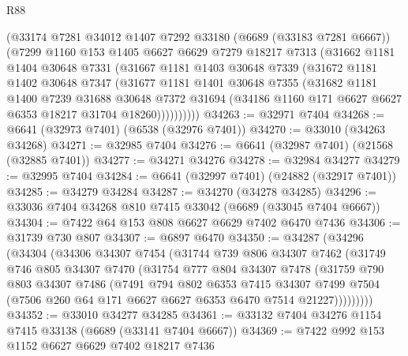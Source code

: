 \begin{lexlean}{R88}
\begin{coremodule}
        (@33174
          @7281
          @34012
          @1407
          @7292
          @33180
          (@6689 (@33183 @7281 @6667))
          (@7299
            @1160
            @153
            @1405
            @6627
            @6629
            @7279
            @18217
            @7313
            (@31662
              @1181
              @1404
              @30648
              @7331
              (@31667
                @1181
                @1403
                @30648
                @7339
                (@31672
                  @1181
                  @1402
                  @30648
                  @7347
                  (@31677
                    @1181
                    @1401
                    @30648
                    @7355
                    (@31682
                      @1181
                      @1400
                      @7239
                      @31688
                      @30648
                      @7372
                      @31694
                      (@34186 @1160 @171 @6627 @6627 @6353 @18217 @31704 @18260))))))))))
@34263 := @32971 @7404
@34268 := @6641 (@32973 @7401) (@6538 (@32976 @7401))
@34270 := @33010 (@34263 @34268)
@34271 := @32985 @7404
@34276 := @6641 (@32987 @7401) (@21568 (@32885 @7401))
@34277 := @34271 @34276
@34278 := @32984 @34277
@34279 := @32995 @7404
@34284 := @6641 (@32997 @7401) (@24882 (@32917 @7401))
@34285 := @34279 @34284
@34287 := @34270 (@34278 @34285)
@34296 := @33036 @7404 @34268 @810 @7415 @33042 (@6689 (@33045 @7404 @6667))
@34304 := @7422 @64 @153 @808 @6627 @6629 @7402 @6470 @7436
@34306 := @31739 @730 @807
@34307 := @6897 @6470
@34350 := @34287
    (@34296
      (@34304
        (@34306
          @34307
          @7454
          (@31744
            @739
            @806
            @34307
            @7462
            (@31749
              @746
              @805
              @34307
              @7470
              (@31754
                @777
                @804
                @34307
                @7478
                (@31759
                  @790
                  @803
                  @34307
                  @7486
                  (@7491
                    @794
                    @802
                    @6353
                    @7415
                    @34307
                    @7499
                    @7504
                    (@7506 @260 @64 @171 @6627 @6627 @6353 @6470 @7514 @21227)))))))))
@34352 := @33010 @34277 @34285
@34361 := @33132 @7404 @34276 @1154 @7415 @33138 (@6689 (@33141 @7404 @6667))
@34369 := @7422 @992 @153 @1152 @6627 @6629 @7402 @18217 @7436

\end{coremodule}
\end{lexlean}
